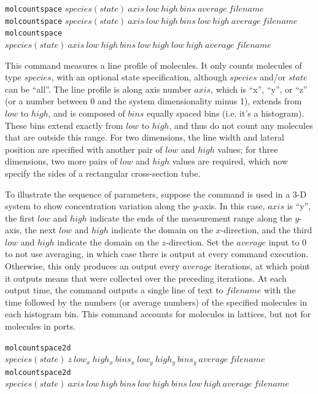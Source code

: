 \documentclass {book}
\newcommand {\ttt} {\texttt}
\begin{document}
\begin{description}
\item{\ttt{molcountspace} $species(state)\ axis\ low\ high\ bins\ average\ filename$\\
\ttt{molcountspace} $species(state)\ axis\ low\ high\ bins\ low\ high\ average\ filename$\\
\ttt{molcountspace} $species(state)\ axis\ low\ high\ bins\ low\ high\ low\ high\ average\ filename$}

This command measures a line profile of molecules. It only counts molecules of type $species$, with an optional state specification, although $species$ and/or $state$ can be ``all''. The line profile is along axis number $axis$, which is ``x'', ``y'', or ``z'' (or a number between 0 and the system dimensionality minus 1), extends from $low$ to $high$, and is composed of $bins$ equally spaced bins (i.e. it's a histogram). These bins extend exactly from $low$ to $high$, and thus do not count any molecules that are outside this range. For two dimensions, the line width and lateral position are specified with another pair of $low$ and $high$ values; for three dimensions, two more pairs of $low$ and $high$ values are required, which now specify the sides of a rectangular cross-section tube.

To illustrate the sequence of parameters, suppose the command is used in a 3-D system to show concentration variation along the $y$-axis. In this case, $axis$ is ``y'', the first $low$ and $high$ indicate the ends of the measurement range along the $y$-axis, the next $low$ and $high$ indicate the domain on the $x$-direction, and the third $low$ and $high$ indicate the domain on the $z$-direction. Set the $average$ input to 0 to not use averaging, in which case there is output at every command execution. Otherwise, this only produces an output every $average$ iterations, at which point it outputs means that were collected over the preceding iterations. At each output time, the command outputs a single line of text to $filename$ with the time followed by the numbers (or average numbers) of the specified molecules in each histogram bin. This command accounts for molecules in lattices, but not for molecules in ports.

\item{\ttt{molcountspace2d} $species(state)\ z\ low_x\ high_x\ bins_x\ low_y\ high_y\ bins_y\ average\ filename$\\
\ttt{molcountspace2d} $species(state)\ axis\ low\ high\ bins\ low\ high\ bins\ low\ high\ average\ filename$}


\end{description}
\end{document}
